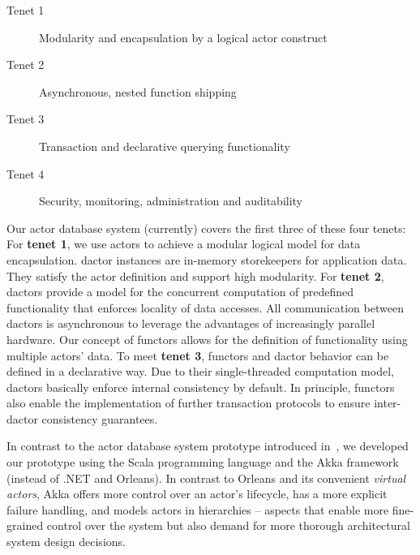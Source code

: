   \begin{description}
    \item[Tenet 1] Modularity and encapsulation by a logical actor construct
    \item[Tenet 2] Asynchronous, nested function shipping
    \item[Tenet 3] Transaction and declarative querying functionality
    \item[Tenet 4] Security, monitoring, administration and auditability
  \end{description}

  Our actor database system (currently) covers the first three of these four tenets:
  For \textbf{tenet 1}, we use actors to achieve a modular logical model for data encapsulation.
  \Gls{dactor} instances are in-memory storekeepers for application data.
  They satisfy the actor definition and support high modularity.
  For \textbf{tenet 2}, \glspl{dactor} provide a model for the concurrent computation of predefined functionality that enforces locality of data accesses.
  All communication between \glspl{dactor} is asynchronous to leverage the advantages of increasingly parallel hardware.
  Our concept of \glspl{functor} allows for the definition of functionality using multiple actors' data.
  To meet \textbf{tenet 3}, \glspl{functor} and \gls{dactor} behavior can be defined in a declarative way.
  Due to their single-threaded computation model, \glspl{dactor} basically enforce internal consistency by default.
  In principle, \glspl{functor} also enable the implementation of further transaction protocols to ensure inter-\gls{dactor} consistency guarantees.

  In contrast to the actor database system prototype introduced in~\cite{manifesto}, we developed our prototype using the Scala programming language and the Akka framework (instead of .NET and Orleans).
  In contrast to Orleans and its convenient \emph{virtual actors}, Akka offers more control over an actor's lifecycle, has a more explicit failure handling, and models actors in hierarchies -- aspects that enable more fine-grained control over the system but also demand for more thorough architectural system design decisions.

